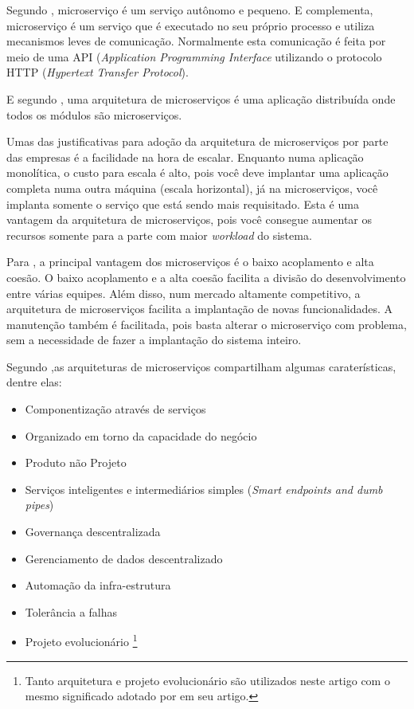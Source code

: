 \documentclass[12pt]{article}
\theoremstyle{plain}
\begin{document}
Segundo \cite{Newman:15}, microserviço é um serviço autônomo e pequeno. E \cite{martinfowler-microservices:2014} complementa, microserviço é um serviço que é executado no seu próprio processo e utiliza mecanismos leves de comunicação. Normalmente esta comunicação é feita por meio de uma API (\textit{Application Programming Interface} utilizando o protocolo HTTP (\textit{Hypertext Transfer Protocol}).

E segundo \cite{Dragoni2017, martinfowler-microservices:2014}, uma arquitetura de microserviços é uma aplicação distribuída onde todos os módulos são microserviços.

Umas das justificativas para adoção da arquitetura de microserviços por parte das empresas é a facilidade na hora de escalar. Enquanto numa aplicação monolítica, o custo para escala é alto, pois você deve implantar uma aplicação completa numa outra máquina (escala horizontal), já na microserviços, você implanta somente o serviço que está sendo mais requisitado. Esta é uma vantagem da arquitetura de microserviços, pois você consegue aumentar os recursos somente para a parte com maior \textit{workload} do sistema. 

Para \cite{wolf:2018}, a principal vantagem dos microserviços é o baixo acoplamento e alta coesão. O baixo acoplamento e a alta coesão facilita a divisão do desenvolvimento entre várias equipes. Além disso, num mercado altamente competitivo, a arquitetura de microserviços facilita a implantação de novas funcionalidades. A manutenção também é facilitada, pois basta alterar o microserviço com problema, sem a necessidade de fazer a implantação do sistema inteiro.

Segundo \cite{martinfowler-microservices:2014},as arquiteturas de microserviços compartilham algumas caraterísticas, dentre elas:

\begin{itemize}
    \item Componentização através de serviços
    \item Organizado em torno da capacidade do negócio
    \item Produto não Projeto
    \item Serviços inteligentes e intermediários simples (\textit{Smart endpoints and dumb pipes})
    \item Governança descentralizada
    \item Gerenciamento de dados descentralizado
    \item Automação da infra-estrutura
    \item Tolerância a falhas
    \item Projeto evolucionário \footnote{Tanto arquitetura e projeto evolucionário são utilizados neste artigo com o mesmo significado adotado por \cite{martinfowler-microservices:2014} em seu artigo.}
\end{itemize}
\end{document}
